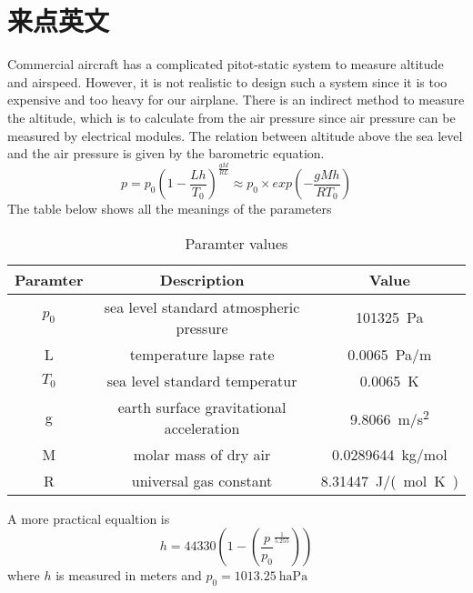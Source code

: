 \chapter{来点英文}
    Commercial aircraft has a complicated pitot-static system to measure altitude and airspeed. However, it is not realistic to design such a system since it is too expensive and too heavy for our airplane. There is an indirect method to measure the altitude, which is to calculate from the air pressure since air pressure can be measured by electrical modules. The relation between altitude above the sea level and the air pressure is given by the barometric equation.
    \begin{equation}
        p=p_0(1-\frac{Lh}{T_0})^{\frac{gM}{RL}}\approx p_0\times exp(-\frac{gMh}{RT_0})
        \label{equ:baro}
    \end{equation}
    The table below shows all the meanings of the parameters
    \begin{table}[ht]
        \caption{Paramter values}
        \centering
        \begin{tabular}[l]{c c c}
            \hline\hline
            Paramter & Description & Value\\
            \hline
            $p_0$   & sea level standard atmospheric pressure   & \SI{101325}{\pascal}\\
            L       & temperature lapse rate                    & \SI{0.0065}{\pascal/\metre}\\
            $T_0$   & sea level standard temperatur             & \SI{0.0065}{\kelvin}\\
            g       & earth surface gravitational acceleration  & \SI{9.8066}{\metre/\second\squared}\\
            M       & molar mass of dry air                     & \SI{0.0289644}{\kilogram/\mole}\\
            R       & universal gas constant                    & \SI{8.31447}{\joule/(\mole.\kelvin)}\\
            \hline
        \end{tabular}
        \label{table:baro}
    \end{table}

    A more practical equaltion is
    \begin{equation}
        h=44330(1-(\frac{p}{p_0}^{\frac{1}{5.255}}))
    \end{equation}
    where $h$ is measured in meters and $p_0=\SI{1013.25}{\hectare\pascal}$
